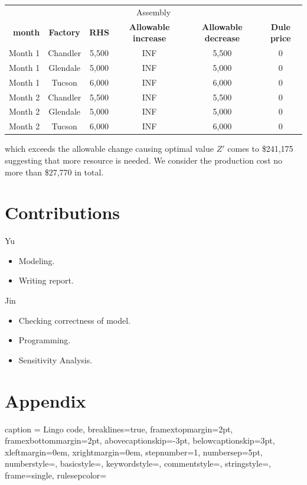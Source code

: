 \documentclass[12pt]{article}
\begin{document}
\begin{itemize}
\begin{center}
\begin{tabular}{c c c c c c }
\hline
\multicolumn{6}{c}{Assembly} \\
\ \textbf{month} &\textbf{Factory} &\textbf{RHS} & \textbf{Allowable increase} & \textbf{Allowable decrease} &  \textbf{Dule price}\\
\hline
Month 1     &Chandler  &5,500    &INF   &5,500    &0\\
Month 1     &Glendale  &5,000    &INF   &5,000   &0\\
Month 1     &Tucson    &6,000    &INF   &6,000 &0\\
Month 2     &Chandler  &5,500    &INF   &5,500       &0\\
Month 2     &Glendale  &5,000    &INF   &5,000     &0\\
Month 2     &Tucson    &6,000    &INF   &6,000  &0\\
\hline
\end{tabular}
\end{center}

which exceeds the allowable change causing optimal value $Z'$ comes to \$241,175 suggesting that more resource is needed. We consider the production cost no more than \$27,770 in total.
	
\end{itemize}

\section{Contributions}
Yu
\begin{itemize}
	\item Modeling.
	\item Writing report.
\end{itemize}

Jin
\begin{itemize}
	\item Checking correctness of model. 
	\item Programming.
	\item Sensitivity Analysis.
\end{itemize}

\newpage
\section{Appendix}
\begin{changemargin}{0.0 cm}{0.0 cm} 

\lstset
{
caption = Lingo code,
breaklines=true,
framextopmargin=2pt,
framexbottommargin=2pt,
abovecaptionskip=-3pt,
belowcaptionskip=3pt,
xleftmargin=0em,
xrightmargin=0em, 
stepnumber=1,
numbersep=5pt,
numberstyle=\small\color{black},
basicstyle=\ttfamily,
keywordstyle=\color{black},
commentstyle=\color{black},
stringstyle=\color{black},
frame=single,
rulesepcolor=\color{red!20!green!20!blue!20}
}

\end{changemargin}


\end{document}
